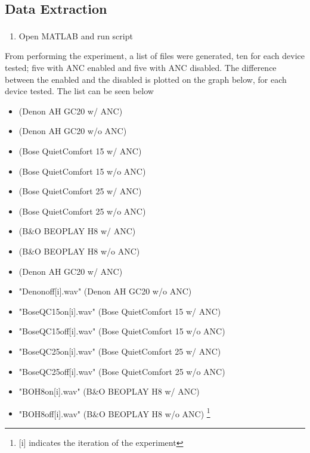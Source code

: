		
\subsection{Data Extraction}
\begin{enumerate}
	\item Open MATLAB\textsuperscript{\textregistered} and run script 
\end{enumerate}

From performing the experiment, a list of files were generated, ten for each device tested; five with ANC enabled and five with ANC disabled.
The difference between the enabled and the disabled is plotted on the graph below, for each device tested. The list can be seen below

\begin{itemize}
	\item {}			(Denon AH GC20 w/ ANC)
	\item {}		(Denon AH GC20 w/o ANC)
	\item {}		(Bose QuietComfort 15 w/ ANC)
	\item {}		(Bose QuietComfort 15 w/o ANC)
	\item {}		(Bose QuietComfort 25 w/ ANC)
	\item {}		(Bose QuietComfort 25 w/o ANC)
	\item {}			(B\&O BEOPLAY H8 w/ ANC)
	\item {}			(B\&O BEOPLAY H8 w/o ANC)
	\item {}		(Denon AH GC20 w/ ANC)
	\item "Denonoff[i].wav"		(Denon AH GC20 w/o ANC)
	\item "BoseQC15on[i].wav"		(Bose QuietComfort 15 w/ ANC)
	\item "BoseQC15off[i].wav"		(Bose QuietComfort 15 w/o ANC)
	\item "BoseQC25on[i].wav"		(Bose QuietComfort 25 w/ ANC)
	\item "BoseQC25off[i].wav"		(Bose QuietComfort 25 w/o ANC)
	\item "BOH8on[i].wav"			(B\&O BEOPLAY H8 w/ ANC)
	\item "BOH8off[i].wav"		(B\&O BEOPLAY H8 w/o ANC)
	\footnote{[i] indicates the iteration of the experiment}
\end{itemize}


